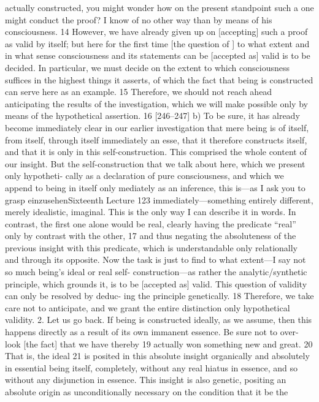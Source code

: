 actually constructed, you might wonder how on the present standpoint such a
one might conduct the proof? I know of no other way than by means of his
consciousness. 14 However, we have already given up on [accepting] such a
proof as valid by itself; but here for the first time [the question of ] to what
extent and in what sense consciousness and its statements can be [accepted as]
valid is to be decided. In particular, we must decide on the extent to which
consciousness suffices in the highest things it asserts, of which the fact that
being is constructed can serve here as an example. 15 Therefore, we should not
reach ahead anticipating the results of the investigation, which we will make
possible only by means of the hypothetical assertion. 16
[246–247] b) To be sure, it has already become immediately clear in our
earlier investigation that mere being is of itself, from itself, through itself
immediately an esse, that it therefore constructs itself, and that it is only in this
self-construction. This comprised the whole content of our insight. But the
self-construction that we talk about here, which we present only hypotheti-
cally as a declaration of pure consciousness, and which we append to being in
itself only mediately as an inference, this is—as I ask you to grasp {einzusehen}Sixteenth Lecture
123
immediately—something entirely different, merely idealistic, imaginal. This is
the only way I can describe it in words. In contrast, the first one alone would
be real, clearly having the predicate “real” only by contrast with the other, 17 and
thus negating the absoluteness of the previous insight with this predicate,
which is understandable only relationally and through its opposite. Now the
task is just to find to what extent—I say not so much being’s ideal or real self-
construction—as rather the analytic/synthetic principle, which grounds it, is to
be [accepted as] valid. This question of validity can only be resolved by deduc-
ing the principle genetically. 18 Therefore, we take care not to anticipate, and
we grant the entire distinction only hypothetical validity.
2. Let us go back. If being is constructed ideally, as we assume, then this
happens directly as a result of its own immanent essence. Be sure not to over-
look [the fact] that we have thereby 19 actually won something new and great. 20
That is, the ideal 21 is posited in this absolute insight organically and absolutely
in essential being itself, completely, without any real hiatus in essence, and so
without any disjunction in essence. This insight is also genetic, positing an
absolute origin as unconditionally necessary on the condition that it be the
